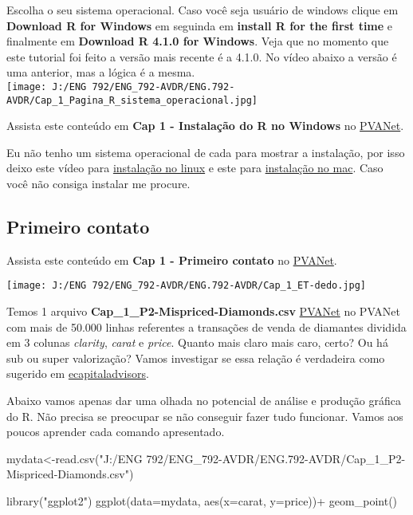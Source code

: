 \documentclass[
]{book}
\newenvironment{Shaded}{\begin{snugshade}}{\end{snugshade}}
\newcommand{\AttributeTok}[1]{\textcolor[rgb]{0.77,0.63,0.00}{#1}}
\newcommand{\FunctionTok}[1]{\textcolor[rgb]{0.00,0.00,0.00}{#1}}
\newcommand{\NormalTok}[1]{#1}
\newcommand{\OtherTok}[1]{\textcolor[rgb]{0.56,0.35,0.01}{#1}}
\newcommand{\SpecialCharTok}[1]{\textcolor[rgb]{0.00,0.00,0.00}{#1}}
\newcommand{\StringTok}[1]{\textcolor[rgb]{0.31,0.60,0.02}{#1}}
\begin{document}
Escolha o seu sistema operacional. Caso você seja usuário de windows clique em \textbf{Download R for Windows} em seguinda em \textbf{install R for the first time} e finalmente em \textbf{Download R 4.1.0 for Windows}. Veja que no momento que este tutorial foi feito a versão mais recente é a 4.1.0. No vídeo abaixo a versão é uma anterior, mas a lógica é a mesma.\\
\texttt{[image: J:/ENG 792/ENG\_792-AVDR/ENG.792-AVDR/Cap\_1\_Pagina\_R\_sistema\_operacional.jpg]}

Assista este conteúdo em \textbf{Cap 1 - Instalação do R no Windows} no \href{https://www2.cead.ufv.br/sistemas/pvanet/geral/login.php}{PVANet}.

Eu não tenho um sistema operacional de cada para mostrar a instalação, por isso deixo este vídeo para \href{https://www.youtube.com/watch?v=np2-FIgzpTg\&ab_channel=AutoDeeDucks}{instalação no linux} e este para \href{https://www.youtube.com/watch?v=LanBozXJjOk\&ab_channel=DataSciencewithTom}{instalação no mac}. Caso você não consiga instalar me procure.

\hypertarget{primeiro-contato}{%
\subsection{Primeiro contato}\label{primeiro-contato}}

Assista este conteúdo em \textbf{Cap 1 - Primeiro contato} no \href{https://www2.cead.ufv.br/sistemas/pvanet/geral/login.php}{PVANet}.

\texttt{[image: J:/ENG 792/ENG\_792-AVDR/ENG.792-AVDR/Cap\_1\_ET-dedo.jpg]}

Temos 1 arquivo \textbf{Cap\_1\_P2-Mispriced-Diamonds.csv} \href{https://www2.cead.ufv.br/sistemas/pvanet/geral/login.php}{PVANet} no PVANet com mais de 50.000 linhas referentes a transações de venda de diamantes dividida em 3 colunas \emph{clarity}, \emph{carat} e \emph{price}. Quanto mais claro mais caro, certo? Ou há sub ou super valorização? Vamos investigar se essa relação é verdadeira como sugerido em \href{https://ecapitaladvisors.com/blog/finding-mispriced-diamonds/}{ecapitaladvisors}.

Abaixo vamos apenas dar uma olhada no potencial de análise e produção gráfica do R. Não precisa se preocupar se não conseguir fazer tudo funcionar. Vamos aos poucos aprender cada comando apresentado.

\begin{Shaded}
\begin{Highlighting}[]
\NormalTok{mydata}\OtherTok{\textless{}{-}}\FunctionTok{read.csv}\NormalTok{(}\StringTok{"J:/ENG 792/ENG\_792{-}AVDR/ENG.792{-}AVDR/Cap\_1\_P2{-}Mispriced{-}Diamonds.csv"}\NormalTok{)}

\FunctionTok{library}\NormalTok{(}\StringTok{"ggplot2"}\NormalTok{)}
\FunctionTok{ggplot}\NormalTok{(}\AttributeTok{data=}\NormalTok{mydata, }\FunctionTok{aes}\NormalTok{(}\AttributeTok{x=}\NormalTok{carat, }\AttributeTok{y=}\NormalTok{price))}\SpecialCharTok{+} 
  \FunctionTok{geom\_point}\NormalTok{()}
\end{Highlighting}
\end{Shaded}
\end{document}
